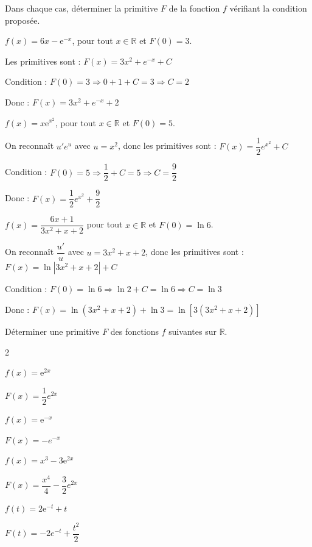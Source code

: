 \documentclass[11pt,a4paper]{article}  %
\begin{document}
Dans chaque cas, déterminer la primitive $F$ de la fonction $f$ vérifiant la condition proposée.
	\begin{enumMet}
		\item $f(x)=6 x-\mathrm{e}^{-x}$, pour tout $x \in \mathbb{R}$ et $F(0)=3$.
		\begin{corrBox}
			Les primitives sont : $F(x) = 3x^2 + e^{-x} + C$
				
			Condition : $F(0) = 3 \Rightarrow 0 + 1 + C = 3 \Rightarrow C = 2$
				
			Donc : $F(x) = 3x^2 + e^{-x} + 2$
		\end{corrBox}
		\item $f(x)=x \mathrm{e}^{x^2}$, pour tout $x \in \mathbb{R}$ et $F(0)=5$.
		\begin{corrBox}
			On reconnaît $u'e^u$ avec $u = x^2$, donc les primitives sont : $F(x) = \dfrac{1}{2}e^{x^2} + C$
				
			Condition : $F(0) = 5 \Rightarrow \dfrac{1}{2} + C = 5 \Rightarrow C = \dfrac{9}{2}$
				
			Donc : $F(x) = \dfrac{1}{2}e^{x^2} + \dfrac{9}{2}$
		\end{corrBox}
		\item $f(x)=\dfrac{6 x+1}{3 x^2+x+2}$ pour tout $x \in \mathbb{R}$ et $F(0)=\ln 6$.
		\begin{corrBox}
			On reconnaît $\dfrac{u'}{u}$ avec $u = 3x^2 + x + 2$, donc les primitives sont : $F(x) = \ln|3x^2+x+2| + C$
				
			Condition : $F(0) = \ln 6 \Rightarrow \ln 2 + C = \ln 6 \Rightarrow C = \ln 3$
				
			Donc : $F(x) = \ln(3x^2+x+2) + \ln 3 = \ln[3(3x^2+x+2)]$
		\end{corrBox}
	\end{enumMet}

\vspace*{-0.5cm}
\exerciceDS{}

Déterminer une primitive $F$ des fonctions $f$ suivantes sur $\mathbb{R}$.
\begin{multicols}{2}
	\begin{enumMet}
		\item $f(x)=\mathrm{e}^{2 x}$
		\begin{corrBox}
			$F(x) = \dfrac{1}{2}e^{2x}$
		\end{corrBox}
		\item $f(x)=\mathrm{e}^{-x}$
		\begin{corrBox}
			$F(x) = -e^{-x}$
		\end{corrBox}
		\columnbreak
		
		\item $f(x)=x^3-3 \mathrm{e}^{2 x}$
		\begin{corrBox}
			$F(x) = \dfrac{x^4}{4} - \dfrac{3}{2}e^{2x}$
		\end{corrBox}
		\item $f(t)=2 \mathrm{e}^{-t}+t$
		\begin{corrBox}
			$F(t) = -2e^{-t} + \dfrac{t^2}{2}$
		\end{corrBox}
	\end{enumMet}
\end{multicols}
\end{document}
